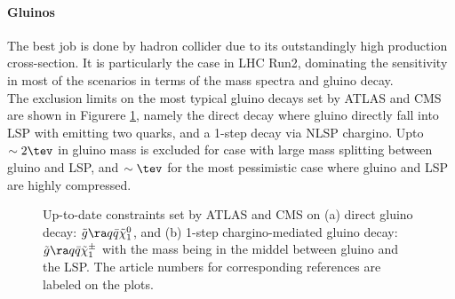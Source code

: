 \paragraph{Gluinos}
The best job is done by hadron collider due to its outstandingly high production cross-section.
It is particularly the case in LHC Run2, dominating the sensitivity in most of the scenarios in terms of the mass spectra and gluino decay. \\

The exclusion limits on the most typical gluino decays set by ATLAS and CMS are shown in Figurere \ref{fig::Introduction::LHCLimitGG}, namely the direct decay where gluino directly fall into LSP with emitting two quarks, and a 1-step decay via NLSP chargino. Upto $\sim 2\tev$ in gluino mass is excluded for case with large mass splitting between gluino and LSP, and $\sim \tev$ for the most pessimistic case where gluino and LSP are highly compressed.\\

\begin{figure}[h]
  \centering
    \caption{Up-to-date constraints set by ATLAS and CMS on (a) direct gluino decay: $\tg \ra q \bar{q} \tLSP$, and (b) 1-step chargino-mediated gluino decay: $\tg \ra q\bar{q} \tchic$ with the mass being in the middel between gluino and the LSP. The article numbers for corresponding references are labeled on the plots. }
    \label{fig::Introduction::LHCLimitGG}
\end{figure}


